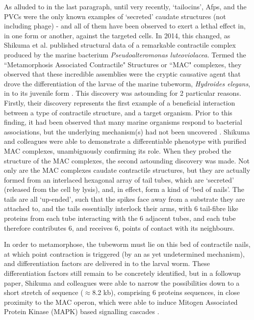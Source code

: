 \label{mac}
\hspace{-.1cm}As alluded to in the last paragraph, until very recently, `tailocins', Afps, and the PVCs were the only known examples of `secreted' caudate structures (not including phage) - and all of them have been observed to exert a lethal effect in, in one form or another, against the targeted cells. In 2014, this changed, as Shikuma et al. published structural data of a remarkable contractile complex produced by the marine bacterium \emph{Pseudoalteromonas luteoviolacea}. Termed the ``Metamorphosis Associated Contractile" Structures or ``MAC" complexes, they observed that these incredible assemblies were the cryptic causative agent that drove the differentiation of the larvae of the marine tubeworm, \emph{Hydroides elegans}, in to its juvenile form \citep{Shikuma2014}. This discovery was astounding for 2 particular reasons. Firstly, their discovery represents the first example of a beneficial interaction between a type of contractile structure, and a target organism. Prior to this finding, it had been observed that many marine organisms respond to bacterial associations, but the underlying mechanism(s) had not been uncovered \citep{Hadfield2011}. Shikuma and colleagues were able to demonstrate a differentiable phenotype with purified MAC complexes, unambiguously confirming its role. When they probed the structure of the MAC complexes, the second astounding discovery was made. Not only are the MAC complexes caudate contractile structures, but they are actually formed from an interlaced hexagonal array of tail tubes, which are `secreted' (released from the cell by lysis), and, in effect, form a kind of `bed of nails'. The tails are all `up-ended', such that the spikes face away from a substrate they are attached to, and the tails essentially interlock their arms, with 6 tail-fibre like proteins from each tube interacting with the 6 adjacent tubes, and each tube therefore contributes 6, and receives 6, points of contact with its neighbours.

In order to metamorphose, the tubeworm must lie on this bed of contractile nails, at which point contraction is triggered (by an as yet undetermined mechanism), and differentiation factors are delivered in to the larval worm. These differentiation factors still remain to be concretely identified, but in a followup paper, Shikuma and colleagues were able to narrow the possibilities down to a short stretch of sequence ($\approx$8.2 kb), comprising 6 proteins sequences, in close proximity to the MAC operon, which were able to induce Mitogen Associated Protein Kinase (MAPK) based signalling cascades \citep{Shikuma2016}.

